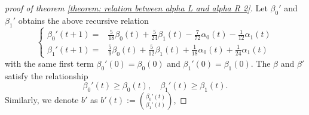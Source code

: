 \documentclass{article}
\begin{document}
\begin{proof}[proof of theorem \ref{theorem: relation between alpha L and alpha R 2}]
    Let $\beta_0'$ and $\beta_1'$ obtains the above recursive relation
    \begin{equation}
        \begin{cases}
            \beta_0'(t+1) =& \frac{5}{18} \beta_0(t)+\frac{5}{24} \beta_1(t)-\frac{7}{72} \alpha_0(t)-\frac{1}{12} \alpha_1(t) \\
        \beta_1'(t+1)  =& \frac{5}{9} \beta_0(t)+\frac{5}{12} \beta_1(t)+\frac{1}{18} \alpha_0(t)+\frac{1}{24} \alpha_1(t)
        \end{cases}
        \label{eq: zz anonymous 25}
    \end{equation}
    with the same first term $\beta_0'(0) = \beta_0(0)$ and $\beta_1'(0) = \beta_1(0)$. The $\beta$ and $\beta'$ satisfy the relationship
    \begin{equation}
        \beta_0'(t) \geq \beta_0(t),\quad  \beta_1'(t) \geq \beta_1(t).
    \end{equation}
    Similarly, we denote $b'$ as $b'(t):=\binom{\beta_0'(t)}{\beta_1'(t)}$,
    

\end{proof}
\end{document}

